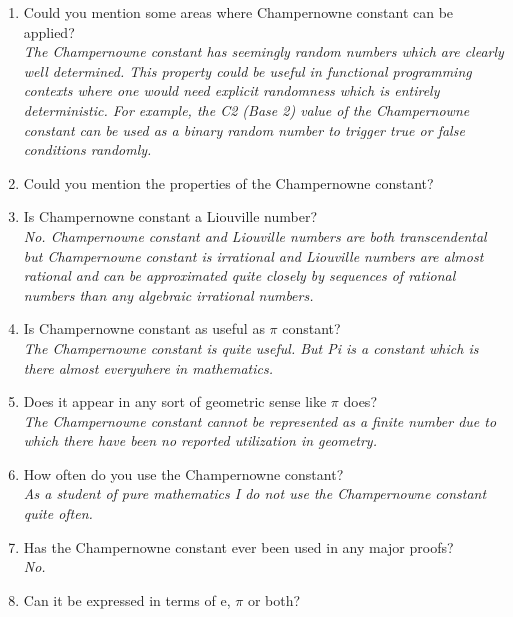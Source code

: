 \documentclass{article}
\begin{document}
\begin{enumerate}
	\item Could you mention some areas where Champernowne constant can be applied?
	\\ {\it The Champernowne constant has seemingly random numbers which are clearly well determined. This property could be useful in functional programming contexts where one would need explicit randomness which is entirely deterministic. For example, the C2 (Base 2) value of the Champernowne constant can be used as a binary random number to trigger true or false conditions randomly.}
	\item Could you mention the properties of the Champernowne constant?
	\item Is Champernowne constant a Liouville number?
	\\ {\it No. Champernowne constant and Liouville numbers are both transcendental but Champernowne constant is irrational and Liouville numbers are almost rational and can be approximated quite closely by sequences of rational numbers than any algebraic irrational numbers.}
	\item Is Champernowne constant as useful as  \( \pi \) constant?
	\\ {\it The Champernowne constant is quite useful. But Pi is a constant which is there almost everywhere in mathematics. }
	\item Does it appear in any sort of geometric sense like  \( \pi \) does?
	\\ {\it The Champernowne constant cannot be represented as a finite number due to which there have been no reported utilization in geometry.}
	\item How often do you use the Champernowne constant?
	\\ {\it As a student of pure mathematics I do not use the Champernowne constant quite often.}
	\item Has the Champernowne constant ever been used in any major proofs? 
	\\ {\it No.}
	\item Can it be expressed in terms of e,  \( \pi \) or both? 

\end{enumerate}
\end{document}

